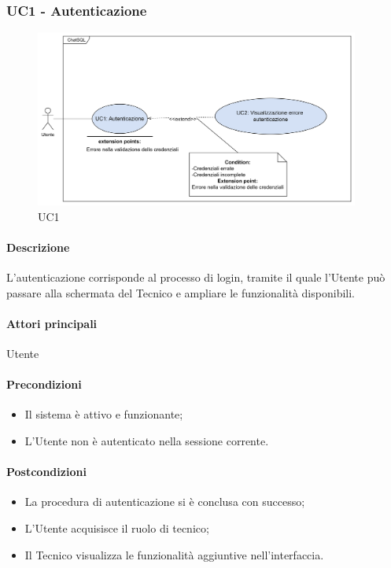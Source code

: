 \subsubsection{UC1 - Autenticazione}\label{UC1}

\begin{figure}[H]
  \centering
  \includegraphics[width=0.95\textwidth]{assets/uc1.png}
  \caption{UC1}
\end{figure}

\paragraph*{Descrizione}
L'autenticazione corrisponde al processo di login, tramite il quale l'Utente può passare alla schermata del Tecnico e ampliare le funzionalità disponibili.

\paragraph*{Attori principali}
Utente

\paragraph*{Precondizioni}
\begin{itemize}
  \item Il sistema è attivo e funzionante;
  \item L'Utente non è autenticato nella sessione corrente.
\end{itemize}

\paragraph*{Postcondizioni}
\begin{itemize}
  \item La procedura di autenticazione si è conclusa con successo;
  \item L'Utente acquisisce il ruolo di tecnico;
  \item Il Tecnico visualizza le funzionalità aggiuntive nell'interfaccia.  
\end{itemize}

